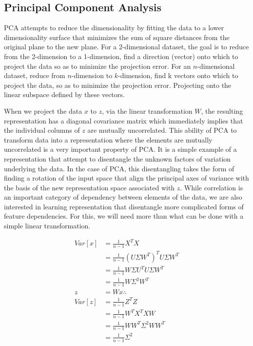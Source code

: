 \documentclass[12pt]{article}
\begin{document}
\subsection{Principal Component Analysis}
PCA attempts to reduce the dimensionality by fitting the data to a lower dimensionality surface that minimizes the sum of square distances from the original plane to the new plane. For a 2-dimensional dataset, the goal is to reduce from the 2-dimension to a 1-dimension, find a direction (vector) onto which to project the data so as to minimize the projection error. For an $n$-dimensional dataset, reduce from $n$-dimension to $k$-dimension, find k vectors onto which to project the data, so as to minimize the projection error. Projecting onto the linear subspace defined by these vectors.

When we project the data $x$ to $z$, via the linear transformation $W$, the resulting representation has a diagonal covariance matrix which immediately implies that the individual columns of $z$ are mutually uncorrelated.  This ability of PCA to transform data into a representation where the elements are mutually uncorrelated is a very important property of PCA. It is a simple example of a representation that attempt to disentangle the unknown factors of variation underlying the data. In the case of PCA, this disentangling takes the form of finding a rotation of the input space that align the principal axes of variance with the basis of the new representation space associated with $z$. While correlation is an important category of dependency between elements of the data, we are also interested in learning representation that disentangle more complicated forms of feature dependencies. For this, we will need more than what can be done with a simple linear transformation.

\begin{align*}
Var[x] & = \frac{1}{n-1}X^TX \\
& =  \frac{1}{n-1}(U\Sigma W^T)^TU\Sigma W^T \\
& =  \frac{1}{n-1}W\Sigma U^TU\Sigma W^T \\
& =  \frac{1}{n-1}W\Sigma^2 W^T \\
z &= Wx\therefore \\
Var[z] &= \frac{1}{n-1}Z^TZ \\
& = \frac{1}{n-1}W^TX^TXW \\
& = \frac{1}{n-1}WW^T\Sigma^2WW^T \\
& = \frac{1}{n-1}\Sigma^2 \\
\end{align*}
\end{document}
